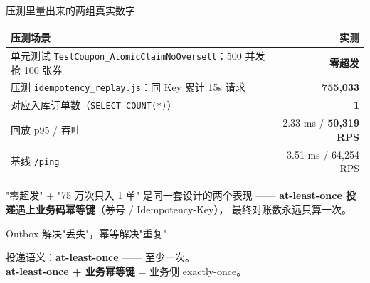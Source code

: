 \documentclass[aspectratio=169,11pt]{beamer}
\begin{document}
\begin{frame}[shrink]{压测里量出来的两组真实数字}
\begin{tabular}{@{}lr@{}}
\toprule
压测场景 & 实测 \\
\midrule
单元测试 \texttt{TestCoupon\_AtomicClaimNoOversell}：500 并发抢 100 张券 & \textbf{零超发} \\
压测 \texttt{idempotency\_replay.js}：同 Key 累计 15s 请求    & \textbf{755{,}033} \\
\hspace{4mm}对应入库订单数（\texttt{SELECT COUNT(*)}）          & \textbf{1} \\
\hspace{4mm}回放 p95 / 吞吐                                    & 2.33 ms / \textbf{50{,}319 RPS} \\
\hspace{4mm}基线 \texttt{/ping}                               & 3.51 ms / 64{,}254 RPS \\
\bottomrule
\end{tabular}
\vspace{3mm}
\small "零超发" + "75 万次只入 1 单" 是同一套设计的两个表现 ——
\textbf{at-least-once 投递}遇上\textbf{业务码幂等键}（券号 / Idempotency-Key），
最终对账数永远只算一次。
\end{frame}

\begin{frame}[shrink]{Outbox 解决"丢失"，幂等解决"重复"}
\begin{center}
\end{center}
\vspace{2mm}
\small 投递语义：\textbf{at-least-once} —— 至少一次。\\
\textbf{at-least-once + 业务幂等键} = 业务侧 exactly-once。
\end{frame}
\end{document}
